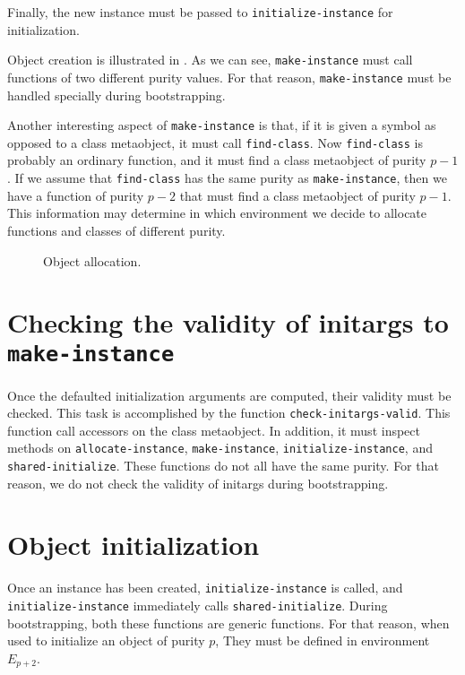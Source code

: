 Finally, the new instance must be passed to
\texttt{initialize-instance} for initialization.

Object creation is illustrated in .  As we
can see, \texttt{make-instance} must call functions of two different
purity values.  For that reason, \texttt{make-instance} must be
handled specially during bootstrapping.

Another interesting aspect of \texttt{make-instance} is that, if it is
given a symbol as opposed to a class metaobject, it must call
\texttt{find-class}.  Now \texttt{find-class} is probably an ordinary
function, and it must find a class metaobject of purity $p-1$.  If we
assume that \texttt{find-class} has the same purity as
\texttt{make-instance}, then we have a function of purity $p-2$ that
must find a class metaobject of purity $p-1$.  This information may
determine in which environment we decide to allocate functions and
classes of different purity.

\begin{figure}
\begin{center}
\end{center}
\caption{\label{fig-make-instance}
Object allocation.}
\end{figure}

\section{Checking the validity of initargs to \texttt{make-instance}}

Once the defaulted initialization arguments are computed, their
validity must be checked.  This task is accomplished by the function
\texttt{check-initargs-valid}.  This function call accessors on the
class metaobject.  In addition, it must inspect methods on
\texttt{allocate-instance}, \texttt{make-instance},
\texttt{initialize-instance}, and \texttt{shared-initialize}.
These functions do not all have the same purity.  For that reason, we
do not check the validity of initargs during bootstrapping.

\section{Object initialization}

Once an instance has been created, \texttt{initialize-instance} is
called, and \texttt{initialize-instance} immediately calls
\texttt{shared-initialize}.  During bootstrapping, both these
functions are generic functions.  For that reason, when used to
initialize an object of purity $p$,  They must be defined in
environment $E_{p+2}$.

